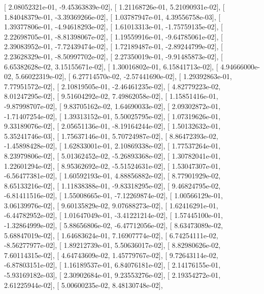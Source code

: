 \documentclass{article}
\begin{document}
       [  2.08052321e-01,  -9.45363839e-02],
       [  1.21168726e-01,   5.21090931e-02],
       [  1.84048379e-01,  -3.39369266e-02],
       [  1.03787947e-01,   4.39556758e-03],
       [  1.39377806e-01,  -4.94618293e-02],
       [  1.61013313e-01,  -1.75759135e-02],
       [  2.22698705e-01,  -8.81398067e-02],
       [  1.19559916e-01,  -9.64785061e-02],
       [  2.39083952e-01,  -7.72439474e-02],
       [  1.72189487e-01,  -2.89244799e-02],
       [  2.23628329e-01,  -8.50997702e-02],
       [  2.27350019e-01,  -9.91485873e-02],
       [  6.65382628e-02,   3.15155671e-02],
       [  1.30016802e-01,   6.15841713e-02],
       [  4.94666000e-02,   5.66022319e-02],
       [  6.27714570e-02,  -2.57441690e-02],
       [  1.29392863e-01,   7.77951572e-02],
       [  2.10819505e-01,  -2.46461235e-02],
       [  4.82779223e-02,   8.01247295e-02],
       [  9.51604292e-02,   7.49862058e-02],
       [  1.15851416e-01,  -9.87998707e-02],
       [  9.83705162e-02,   1.64690033e-02],
       [  2.09302872e-01,  -1.71407254e-02],
       [  1.39313152e-01,   5.50025795e-02],
       [  1.07319626e-01,   9.33189076e-02],
       [  2.05651136e-01,  -8.19164244e-02],
       [  1.50132632e-01,   5.35241746e-03],
       [  1.75637146e-01,   5.70724987e-02],
       [  8.86472393e-02,  -1.45898428e-02],
       [  1.62833001e-01,   2.10869338e-02],
       [  1.77537264e-01,   8.23979806e-02],
       [  5.01362452e-02,  -5.26893368e-02],
       [  1.30782041e-01,   1.22601294e-02],
       [  8.95362692e-02,  -5.51524631e-02],
       [  1.53047307e-01,  -6.56477381e-02],
       [  1.60592193e-01,   4.88856882e-02],
       [  8.77901929e-02,   8.65133216e-02],
       [  1.11838388e-01,  -9.83318295e-02],
       [  9.46824795e-02,  -6.81411516e-02],
       [  1.55008665e-01,  -7.12269874e-02],
       [  1.00566129e-01,   3.06139976e-02],
       [  9.60135829e-02,   9.07688273e-02],
       [  1.62416291e-01,  -6.44782952e-02],
       [  1.01647049e-01,  -3.41221214e-02],
       [  1.57445100e-01,  -1.32864999e-02],
       [  5.88656806e-02,  -6.47712056e-02],
       [  8.63473089e-02,   5.68847019e-02],
       [  1.64683624e-01,   7.16907774e-02],
       [  6.74254111e-02,  -8.56277977e-02],
       [  1.89212739e-01,   5.50636017e-02],
       [  8.82980626e-02,   7.60114315e-02],
       [  4.64743609e-02,   1.45779767e-02],
       [  9.72643114e-02,  -6.87803151e-02],
       [  1.16189537e-01,   6.84076181e-02],
       [  2.14176155e-01,  -5.93169182e-03],
       [  2.30902684e-01,   9.23553276e-02],
       [  2.19354272e-01,   2.61225944e-02],
       [  5.00600235e-02,   8.48130748e-02],
\end{document}
